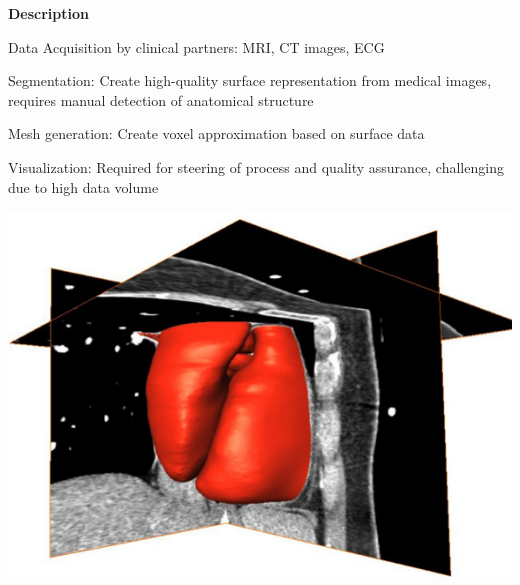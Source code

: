 \documentclass[12pt]{ICSPoster}
\begin{document}
\begin{posterbox}[2]
\begin{headerbox}[
        title=End-to-End Workflow,
        height=0.25\textheight,
        width=0.47\textwidth]
      \begin{minipage}{0.40\textwidth}\sf
        \textbf{Description}
        \begin{compactitem}
          \item Data Acquisition by clinical partners: MRI, CT images, ECG
          \item Segmentation: Create high-quality surface representation from medical images,
                requires manual detection of anatomical structure
          \item Mesh generation: Create voxel approximation based on surface data
          \item Visualization: Required for steering of process and quality assurance, challenging
                due to high data volume
        \end{compactitem}
      \end{minipage}
      \begin{minipage}{0.40\textwidth}\sf
        \hspace{2cm}\includegraphics[width=\textwidth]{AMIRA}
      \end{minipage}
    \end{headerbox}


\end{posterbox}
\end{document}
